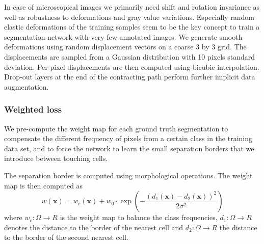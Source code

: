 In case of microscopical images we primarily need shift and rotation invariance as well as
robustness to deformations and gray value variations. Especially random elastic deformations of the training samples seem to be the key concept to train
a segmentation network with very few annotated images. We generate smooth
deformations using random displacement vectors on a coarse 3 by 3 grid. The
displacements are sampled from a Gaussian distribution with 10 pixels standard
deviation. Per-pixel displacements are then computed using bicubic interpolation. Drop-out layers at the end of the contracting path perform further implicit
data augmentation.
\subsubsection{Weighted loss}
We pre-compute the weight map for each ground truth segmentation to compensate the different frequency of pixels from a certain class in the training
data set, and to force the network to learn the small separation borders that we
introduce between touching cells. 

The separation border is computed using morphological operations. The
weight map is then computed as
$$
w(\mathbf{x})=w_c(\mathbf{x})+w_0\cdot \exp \left(- \frac{(d_1(\mathbf{x})-d_2(\mathbf{x}))^2}{2\sigma^2}\right)
$$
where $w_c: \Omega \rightarrow R$ is the weight map to balance the class frequencies, $d_1: \Omega \rightarrow R$ denotes the distance to the border of the nearest cell and $d_2: \Omega \rightarrow R$ the distance
to the border of the second nearest cell. 